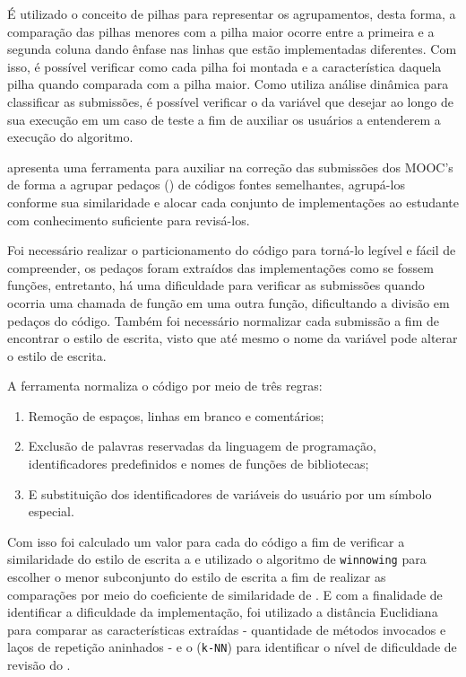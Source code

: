 	    É utilizado o conceito de pilhas para representar os agrupamentos, desta forma,
	    a comparação das pilhas menores com a pilha maior ocorre entre a primeira e a
	    segunda coluna dando ênfase nas linhas que estão implementadas diferentes. Com
	    isso, é possível verificar como cada pilha foi montada e a característica daquela
	    pilha quando comparada com a pilha maior. Como utiliza análise dinâmica para
	    classificar as submissões, é possível verificar o  da
	    variável que desejar ao longo de sua execução em um caso de teste a fim de
	    auxiliar os usuários a entenderem a execução do algoritmo.
	    
	     apresenta uma ferramenta para auxiliar na correção das
	    submissões dos MOOC's de forma a agrupar pedaços () de códigos
	    fontes semelhantes, agrupá-los conforme sua similaridade e alocar cada conjunto
	    de implementações ao estudante com conhecimento suficiente para revisá-los.
	    
	    Foi necessário realizar o particionamento do código para torná-lo legível
	    e fácil de compreender, os pedaços foram extraídos das implementações como
	    se fossem funções, entretanto, há uma dificuldade para verificar as submissões
	    quando ocorria uma chamada de função em uma outra função, dificultando a divisão
	    em pedaços do código. Também foi necessário normalizar cada submissão a fim de
	    encontrar o estilo de escrita, visto que até mesmo o nome da variável pode
	    alterar o estilo de escrita.
	    
	    A ferramenta\cite{Wei2015} normaliza o código por meio de três regras:
	    \begin{enumerate}
	    	\item Remoção de espaços, linhas em branco e comentários;
	    	\item Exclusão de palavras reservadas da linguagem de programação,
	    	identificadores predefinidos e nomes de funções de bibliotecas;
	    	\item E substituição dos identificadores de variáveis do usuário por um
	    	símbolo especial.
	    \end{enumerate}
	    Com isso foi calculado um valor  para cada 
	    do código a fim de verificar a similaridade do estilo de escrita 
	    a  e utilizado o algoritmo de \texttt{winnowing} para escolher
	    o menor subconjunto do estilo de escrita a fim de realizar as comparações
	    por meio do coeficiente de similaridade de . E com a finalidade
	    de identificar a dificuldade da implementação, foi utilizado a distância
	    Euclidiana para comparar as características extraídas - quantidade de métodos
	    invocados e laços de repetição aninhados - e o 
	    (\texttt{k-NN}) para identificar o nível de dificuldade de revisão do
	    .
	    
